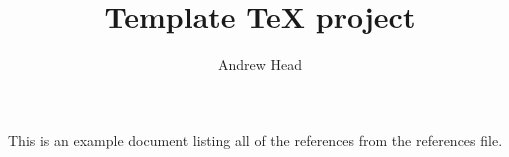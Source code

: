 \documentclass[manuscript,screen,anonymous]{acmart}
\title{Template TeX project}
\author{Andrew Head}
\affiliation{%
  \institution{University of Pennsylvania}
  \city{Philadelphia, PA}
  \country{United States of America}
}
\begin{document}
\maketitle

This is an example document listing all of the references
from the references file.

\nocite{*}


\end{document}
